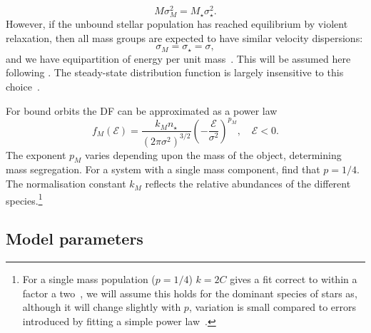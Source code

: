\documentclass[useAMS,usedcolumn,usegraphicx,usenatbib]{mn2e}
\begin{document}
\begin{equation}
M \sigma_M^2 = M_\star \sigma_\star^2.
\end{equation}
However, if the unbound stellar population has reached equilibrium by violent relaxation, then all mass groups are expected to have similar velocity dispersions:
\begin{equation}
\sigma_M = \sigma_\star = \sigma,
\end{equation}
and we have equipartition of energy per unit mass~\citep{Lynden-Bell1967}. This will be assumed here following \citet{Alexander2009, O'Leary2009}. The steady-state distribution function is largely insensitive to this choice~\citep{Bahcall1977, Alexander2009}.

For bound orbits the DF can be approximated as a power law~\citep{Peebles1972}
\begin{equation}
f_M(\mathcal{E}) = \frac{k_M n_\star}{(2\pi\sigma^2)^{3/2}}\left(-\frac{\mathcal{E}}{\sigma^2}\right)^{p_M},\quad\mathcal{E} < 0.
\label{eq:Bound_DF}
\end{equation}
The exponent $p_M$ varies depending upon the mass of the object, determining mass segregation. For a system with a single mass component, \citet{Bahcall1976} find that $p = 1/4$. The normalisation constant $k_M$ reflects the relative abundances of the different species.\footnote{For a single mass population ($p = 1/4$) $k = 2 C$ gives a fit correct to within a factor a two~\citep{Bahcall1976,Keshet2009}, we will assume this holds for the dominant species of stars as, although it will change slightly with $p$, variation is small compared to errors introduced by fitting a simple power law~\citep{Hopman2006, Alexander2009}.}

\subsection{Model parameters}
\end{document}
